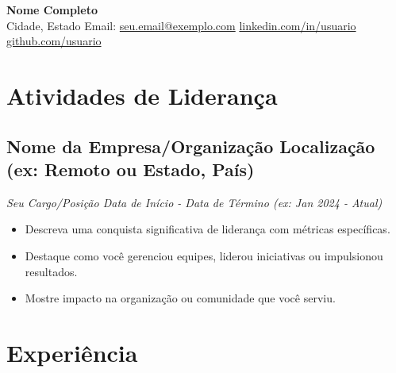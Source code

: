\documentclass[a4paper,10pt]{article}
\begin{document}
\begin{center}
    {\LARGE \textbf{Nome Completo}} 
    \\ [0.1cm]
    Cidade, Estado
    {\textbullet}
    Email: \href{mailto:seu.email@exemplo.com}{seu.email@exemplo.com} 
    {\textbullet}
    \href{https://linkedin.com/in/usuario}{linkedin.com/in/usuario} 
    {\textbullet}
    \href{https://github.com/usuario}{github.com/usuario}
\end{center}


\section{Atividades de Liderança} 
    \subsection*{\texorpdfstring{
            \textbf{Nome da Empresa/Organização} \hfill Localização (ex: Remoto ou Estado, País)
        }{
            Nome da Empresa (Liderança) -- Localização
        }}
    \textit{Seu Cargo/Posição \hfill Data de Início - Data de Término (ex: Jan 2024 - Atual)}
        \begin{itemize}
            \item Descreva uma conquista significativa de liderança com métricas específicas.
            \item Destaque como você gerenciou equipes, liderou iniciativas ou impulsionou resultados.
            \item Mostre impacto na organização ou comunidade que você serviu.
        \end{itemize}


\section{Experiência}
\end{document}
